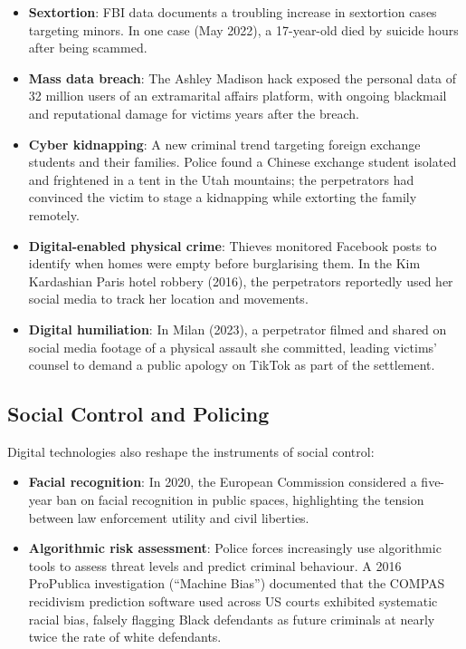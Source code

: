 \documentclass[11pt,a4paper,openany]{report}
\theoremstyle{definition}
\theoremstyle{plain}
\theoremstyle{remark}
\begin{document}
\begin{itemize}
    \item \textbf{Sextortion}: FBI data documents a troubling increase in sextortion cases targeting minors. In one case (May 2022), a 17-year-old died by suicide hours after being scammed.
    \item \textbf{Mass data breach}: The Ashley Madison hack exposed the personal data of 32 million users of an extramarital affairs platform, with ongoing blackmail and reputational damage for victims years after the breach.
    \item \textbf{Cyber kidnapping}: A new criminal trend targeting foreign exchange students and their families. Police found a Chinese exchange student isolated and frightened in a tent in the Utah mountains; the perpetrators had convinced the victim to stage a kidnapping while extorting the family remotely.
    \item \textbf{Digital-enabled physical crime}: Thieves monitored Facebook posts to identify when homes were empty before burglarising them. In the Kim Kardashian Paris hotel robbery (2016), the perpetrators reportedly used her social media to track her location and movements.
    \item \textbf{Digital humiliation}: In Milan (2023), a perpetrator filmed and shared on social media footage of a physical assault she committed, leading victims' counsel to demand a public apology on TikTok as part of the settlement.
\end{itemize}

\subsection{Social Control and Policing}

Digital technologies also reshape the instruments of social control:

\begin{itemize}
    \item \textbf{Facial recognition}: In 2020, the European Commission considered a five-year ban on facial recognition in public spaces, highlighting the tension between law enforcement utility and civil liberties.
    \item \textbf{Algorithmic risk assessment}: Police forces increasingly use algorithmic tools to assess threat levels and predict criminal behaviour. A 2016 ProPublica investigation (``Machine Bias'') documented that the COMPAS recidivism prediction software used across US courts exhibited systematic racial bias, falsely flagging Black defendants as future criminals at nearly twice the rate of white defendants.
\end{itemize}
\end{document}
